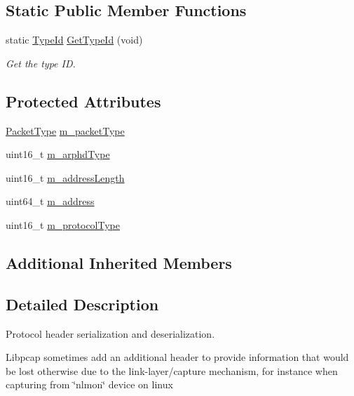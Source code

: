 \subsection*{Static Public Member Functions}
\begin{DoxyCompactItemize}
\item 
static \hyperlink{classns3_1_1TypeId}{Type\+Id} \hyperlink{classns3_1_1SllHeader_a101bd99b0c5d95e517c05fa38adbd137}{Get\+Type\+Id} (void)
\begin{DoxyCompactList}\small\item\em Get the type ID. \end{DoxyCompactList}\end{DoxyCompactItemize}
\subsection*{Protected Attributes}
\begin{DoxyCompactItemize}
\item 
\hyperlink{classns3_1_1SllHeader_a82af509915aa0f97f81f806f2286937c}{Packet\+Type} \hyperlink{classns3_1_1SllHeader_a52acf6bb601a147c066bd73cec97ba64}{m\+\_\+packet\+Type}
\item 
uint16\+\_\+t \hyperlink{classns3_1_1SllHeader_a9c84d8f55665f2dee31b701625d0bc46}{m\+\_\+arphd\+Type}
\item 
uint16\+\_\+t \hyperlink{classns3_1_1SllHeader_a41619d8a4f1011d78340d8c88cfd1dbf}{m\+\_\+address\+Length}
\item 
uint64\+\_\+t \hyperlink{classns3_1_1SllHeader_ada29265e04323c912dda5fd15945a883}{m\+\_\+address}
\item 
uint16\+\_\+t \hyperlink{classns3_1_1SllHeader_ad841f705bde071f5eacbd30672e8d701}{m\+\_\+protocol\+Type}
\end{DoxyCompactItemize}
\subsection*{Additional Inherited Members}


\subsection{Detailed Description}
Protocol header serialization and deserialization. 

Libpcap sometimes add an additional header to provide information that would be lost otherwise due to the link-\/layer/capture mechanism, for instance when capturing from \char`\"{}nlmon\char`\"{} device on linux

